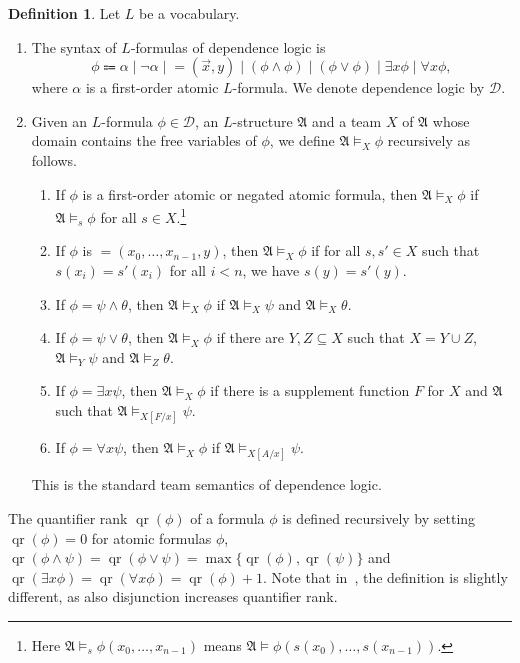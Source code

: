 \documentclass[12pt]{article}
\theoremstyle{definition}
\newtheorem{definition}{Definition}[section]
\newcommand{\A}{\mathfrak{A}}
\DeclareMathOperator{\qr}{qr}
\newcommand{\dep}{\mathop{=}}
\newcommand{\deplog}{\mathcal D}
\begin{document}
\begin{definition}
    Let $L$ be a vocabulary.
    \begin{enumerate}
        \item The syntax of $L$-formulas of dependence logic is
        \[
            \phi \Coloneqq \alpha \mid \neg\alpha \mid \dep(\vec x,y) \mid (\phi\land\phi) \mid (\phi\lor\phi) \mid \exists x\phi \mid \forall x\phi,
        \]
        where $\alpha$ is a first-order atomic $L$-formula. We denote dependence logic by $\deplog$.
        \item Given an $L$-formula $\phi\in\deplog$, an $L$-structure $\A$ and a team $X$ of $\A$ whose domain contains the free variables of $\phi$, we define $\A\models_X\phi$  recursively as follows.
        \begin{enumerate}
            \item If $\phi$ is a first-order atomic or negated atomic formula, then $\A\models_X\phi$ if $\A\models_s\phi$ for all $s\in X$.\footnote{Here $\A\models_s\phi(x_0,\dots,x_{n-1})$ means $\A\models\phi(s(x_0),\dots,s(x_{n-1}))$.}
            \item If $\phi$ is $\dep(x_0,\dots,x_{n-1},y)$, then $\A\models_X\phi$ if for all $s,s'\in X$ such that $s(x_i) = s'(x_i)$ for all $i<n$, we have $s(y) = s'(y)$.
            \item If $\phi = \psi\land\theta$, then $\A\models_X\phi$ if $\A\models_X\psi$ and $\A\models_X\theta$.
            \item If $\phi = \psi\lor\theta$, then $\A\models_X\phi$ if there are $Y,Z\subseteq X$ such that $X = Y\cup Z$, $\A\models_Y\psi$ and $\A\models_Z\theta$.
            \item If $\phi = \exists x\psi$, then $\A\models_X\phi$ if there is a supplement function $F$ for $X$ and $\A$ such that $\A\models_{X[F/x]}\psi$.
            \item If $\phi = \forall x\psi$, then $\A\models_X\phi$ if $\A\models_{X[A/x]}\psi$.
        \end{enumerate}
        This is the standard team semantics of dependence logic.
    \end{enumerate}
\end{definition}

The quantifier rank $\qr(\phi)$ of a formula $\phi$ is defined recursively by setting $\qr(\phi) = 0$ for atomic formulas $\phi$, $\qr(\phi\land\psi) = \qr(\phi\lor\psi) = \max\{\qr(\phi), \qr(\psi)\}$ and $\qr(\exists x\phi) = \qr(\forall x\phi) = \qr(\phi)+1$. Note that in~\cite{MR2351449}, the definition is slightly different, as also disjunction increases quantifier rank.
\end{document}
